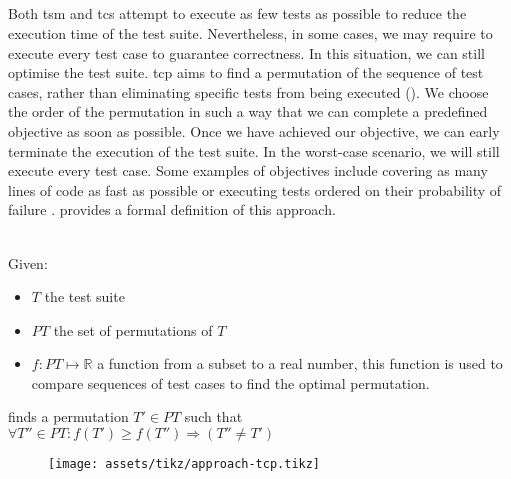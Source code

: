 
\subsection{\tcp{}}
Both \acrshort{tsm} and \acrshort{tcs} attempt to execute as few tests as possible to reduce the execution time of the test suite. Nevertheless, in some cases, we may require to execute every test case to guarantee correctness. In this situation, we can still optimise the test suite. \acrfull{tcp} aims to find a permutation of the sequence of test cases, rather than eliminating specific tests from being executed (). We choose the order of the permutation in such a way that we can complete a predefined objective as soon as possible. Once we have achieved our objective, we can early terminate the execution of the test suite. In the worst-case scenario, we will still execute every test case. Some examples of objectives include covering as many lines of code as fast as possible or executing tests ordered on their probability of failure \cite{10.1002/stv.430}.  provides a formal definition of this approach.

\begin{definition}[\tcp{}]
\label{def:tcp}
\mbox{}\\Given:
\begin{itemize}
	\item $T$ the test suite
	\item $PT$ the set of permutations of $T$
	\item $f: PT \mapsto \mathbb{R}$ a function from a subset to a real number, this function is used to compare sequences of test cases to find the optimal permutation.
\end{itemize}

\noindent \tcp{} finds a permutation $T' \in PT$ such that $\forall T'' \in PT : f(T') \ge f(T'') \Rightarrow (T'' \ne T')$ 
\end{definition}

\begin{figure}[htbp!]
	\centering
	\texttt{[image: assets/tikz/approach-tcp.tikz]}
	\caption{\tcp{}}
	\label{fig:tcp}
\end{figure}